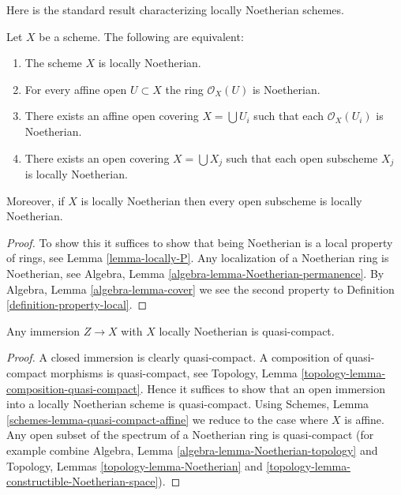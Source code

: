 \noindent
Here is the standard result characterizing locally Noetherian schemes.

\begin{lemma}
\label{lemma-locally-Noetherian}
Let $X$ be a scheme. The following are equivalent:
\begin{enumerate}
\item The scheme $X$ is locally Noetherian.
\item For every affine open $U \subset X$ the ring $\mathcal{O}_X(U)$
is Noetherian.
\item There exists an affine open covering $X = \bigcup U_i$ such that
each $\mathcal{O}_X(U_i)$ is Noetherian.
\item There exists an open covering $X = \bigcup X_j$
such that each open subscheme $X_j$ is locally Noetherian.
\end{enumerate}
Moreover, if $X$ is locally Noetherian then every open subscheme
is locally Noetherian.
\end{lemma}

\begin{proof}
To show this it suffices to show that being Noetherian is a local
property of rings, see Lemma \ref{lemma-locally-P}.
Any localization of a Noetherian ring is Noetherian, see
Algebra, Lemma \ref{algebra-lemma-Noetherian-permanence}.
By Algebra, Lemma \ref{algebra-lemma-cover} we see the second
property to Definition \ref{definition-property-local}.
\end{proof}

\begin{lemma}
\label{lemma-immersion-into-noetherian}
Any immersion $Z \to X$ with $X$ locally Noetherian is quasi-compact.
\end{lemma}

\begin{proof}
A closed immersion is clearly quasi-compact.
A composition of quasi-compact morphisms is quasi-compact,
see Topology, Lemma \ref{topology-lemma-composition-quasi-compact}.
Hence it suffices to show that an open immersion into
a locally Noetherian scheme is quasi-compact.
Using Schemes, Lemma \ref{schemes-lemma-quasi-compact-affine}
we reduce to the case where $X$ is affine.
Any open subset of the spectrum of a Noetherian ring
is quasi-compact (for example
combine Algebra, Lemma \ref{algebra-lemma-Noetherian-topology} and
Topology, Lemmas \ref{topology-lemma-Noetherian} and
\ref{topology-lemma-constructible-Noetherian-space}).
\end{proof}

